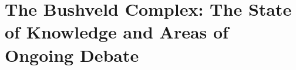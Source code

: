 %
%

\chapter{The Bushveld Complex: The State of Knowledge and Areas of Ongoing Debate}
\label{app:bushveld-review}


